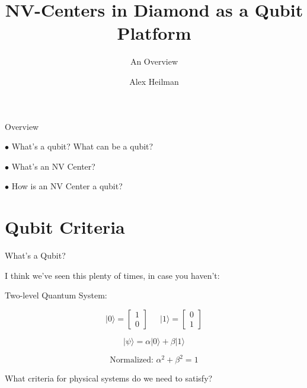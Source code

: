 \documentclass[11pt]{beamer}
\author{Alex Heilman}
\title{NV-Centers in Diamond as a Qubit Platform}
\subtitle{An Overview}
\begin{document}
\begin{frame}
\titlepage
\end{frame}


\begin{frame}{Overview}

$\bullet$ What's a qubit? \pause What can be a qubit?

\vspace{1cm}\pause

$\bullet$ What's an NV Center?

\vspace{1cm}\pause

$\bullet$ How is an NV Center a qubit?

\vspace{1cm}\pause

\end{frame}

\section{Qubit Criteria}
\begin{frame}{What's a Qubit?}


I think we've seen this plenty of times\pause , in case you haven't:

\vspace{.7cm}

\begin{center}
Two-level Quantum System:


$$
\vert 0 \rangle = \begin{bmatrix}
1 \\ 0
\end{bmatrix} \quad\ \ \vert 1 \rangle = \begin{bmatrix}
0 \\ 1
\end{bmatrix}
$$

$$
\vert \psi \rangle = \alpha \vert 0 \rangle + \beta \vert 1 \rangle
$$

$$
\text{Normalized: }\alpha^2 +\beta^2 = 1
$$

\pause

\vspace{0.4cm}

What criteria for physical systems do we need to satisfy?
\end{center}

\end{frame}
\end{document}

